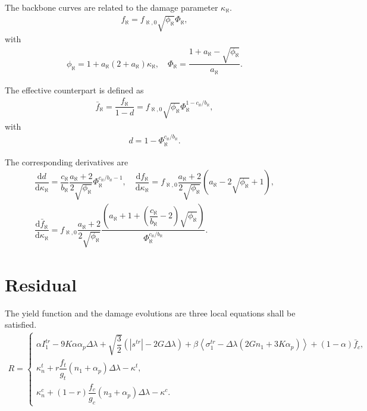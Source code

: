 \documentclass[11pt,fleqn]{article}
\newcommand*{\md}[1]{\mathrm{d}#1}
\newcommand*{\ddfrac}[2]{\dfrac{\md#1}{\md#2}}
\begin{document}
The backbone curves are related to the damage parameter $\kappa_\aleph$.
\begin{gather*}
f_\aleph=f_{\aleph,0}\sqrt{\phi_\aleph}\Phi_\aleph,
\end{gather*}
with
\begin{gather*}
\phi_\aleph=1+a_\aleph\left(2+a_\aleph\right)\kappa_\aleph,\quad
\Phi_\aleph=\dfrac{1+a_\aleph-\sqrt{\phi_\aleph}}{a_\aleph}.
\end{gather*}

The effective counterpart is defined as
\begin{gather*}
\bar{f}_\aleph=\dfrac{f_\aleph}{1-d}=f_{\aleph,0}\sqrt{\phi_\aleph}\Phi_\aleph^{1-c_\aleph/b_\aleph},
\end{gather*}
with
\begin{gather*}
d=1-\Phi_\aleph^{c_\aleph/b_\aleph}.
\end{gather*}

The corresponding derivatives are
\begin{gather*}
\ddfrac{d}{\kappa_\aleph}=\dfrac{c_\aleph}{b_\aleph}\dfrac{a_\aleph+2}{2\sqrt{\phi_\aleph}}\Phi_\aleph^{c_\aleph/b_\aleph-1},\quad
\ddfrac{f_\aleph}{\kappa_\aleph}=f_{\aleph,0}\dfrac{a_\aleph+2}{2\sqrt{\phi_\aleph}}\left(a_\aleph-2\sqrt{\phi_\aleph}+1\right),\\
\ddfrac{\bar{f}_\aleph}{\kappa_\aleph}=f_{\aleph,0}\dfrac{a_\aleph+2}{2\sqrt{\phi_\aleph}}\dfrac{\left(a_\aleph+1+\left(\dfrac{c_\aleph}{b_\aleph}-2\right)\sqrt{\phi_\aleph}\right)}{\Phi_\aleph^{c_\aleph/b_\aleph}}.
\end{gather*}
\section{Residual}
The yield function and the damage evolutions are three local equations shall be satisfied.
\begin{gather}
R=\left\{
\begin{array}{l}
\alpha{}I_1^{tr}-9K\alpha\alpha_p\Delta\lambda+\sqrt{\dfrac{3}{2}}\left(|s^{tr}|-2G\Delta\lambda\right)+\beta\left<\sigma_1^{tr}-\Delta\lambda\left(2Gn_1+3K\alpha_p\right)\right>+\left(1-\alpha\right)\bar{f}_c,\\[4mm]
\kappa^t_n+r\dfrac{f_t}{g_t}(n_1+\alpha_p)\Delta\lambda-\kappa^t,\\[4mm]
\kappa^c_n+(1-r)\dfrac{f_c}{g_c}(n_3+\alpha_p)\Delta\lambda-\kappa^c.
\end{array}
\right.
\end{gather}
\end{document}

